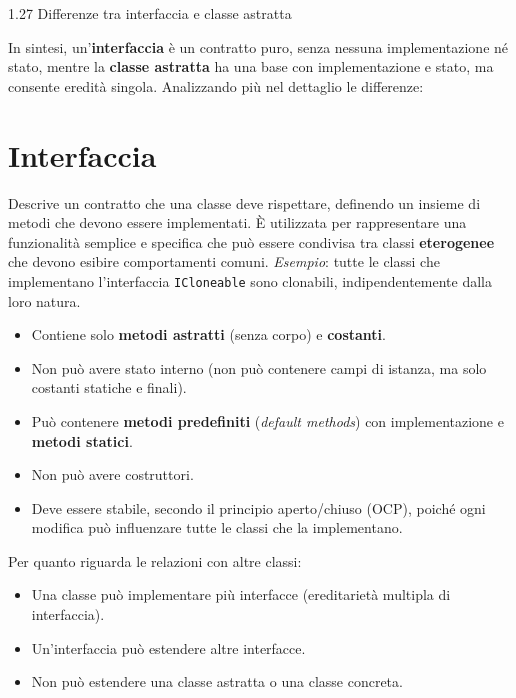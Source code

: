 \begin{problem}{1.27}
Differenze tra interfaccia e classe astratta
\end{problem}
\begin{solution}
In sintesi, un'\textbf{interfaccia} è un contratto puro, senza nessuna implementazione né stato, mentre la \textbf{classe astratta} ha una
base con implementazione e stato, ma consente eredità singola. Analizzando più nel dettaglio le differenze:
\section*{Interfaccia}
Descrive un contratto che una classe deve rispettare, definendo un insieme di metodi che devono essere implementati. 
È utilizzata per rappresentare una funzionalità semplice e specifica che può essere condivisa tra classi \textbf{eterogenee}
che devono esibire comportamenti comuni.
\newline
\textit{Esempio}: tutte le classi che implementano l'interfaccia \texttt{ICloneable} sono clonabili, 
indipendentemente dalla loro natura.
\newline
\begin{itemize}
	\item Contiene solo \textbf{metodi astratti} (senza corpo) e \textbf{costanti}.
	\item Non può avere stato interno (non può contenere campi di istanza, ma solo costanti statiche e finali).
	\item Può contenere \textbf{metodi predefiniti} (\textit{default methods}) con implementazione e \textbf{metodi statici}.
	\item Non può avere costruttori.
	\item Deve essere stabile, secondo il principio aperto/chiuso (OCP), poiché ogni modifica può influenzare tutte le classi 
	che la implementano.
\end{itemize}
Per quanto riguarda le relazioni con altre classi:
\begin{itemize}
	\item Una classe può implementare più interfacce (ereditarietà multipla di interfaccia).
	\item Un'interfaccia può estendere altre interfacce.
	\item Non può estendere una classe astratta o una classe concreta.
\end{itemize}
\newline

\end{solution}
